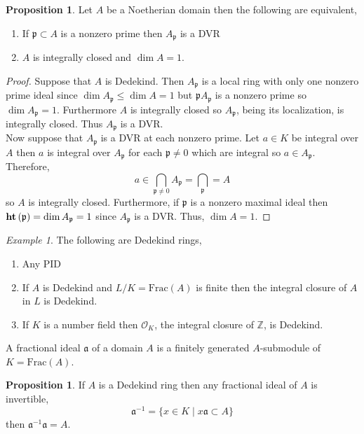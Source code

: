\documentclass[12pt]{article}
\newcommand{\Z}{\mathbb{Z}}
\newcommand{\Frac}[1]{\mathrm{Frac}\left(#1\right)}
\newcommand{\p}{\mathfrak{p}}
\renewcommand{\a}{\mathfrak{a}}
\theoremstyle{remark}
\newtheorem*{example}{Example}
\theoremstyle{definition}
\newtheorem{proposition}[theorem]{Proposition}
\newenvironment{definition}[1][Definition:]{\begin{trivlist}
\item[\hskip \labelsep {\bfseries #1}]}{\end{trivlist}}
\begin{document}
\begin{proposition}
Let $A$ be a Noetherian domain then the following are equivalent,
\begin{enumerate}
\item If $\p \subset A$ is a nonzero prime then $A_{\p}$ is a DVR
\item $A$ is integrally closed and $\dim{A} = 1$.
\end{enumerate}
\end{proposition}

\begin{proof}
Suppose that $A$ is Dedekind. Then $A_{\p}$ is a local ring with only one nonzero prime ideal since $\dim{A_{\p}} \le \dim{A} = 1$ but $\p A_{\p}$ is a nonzero prime so $\dim{A_{\p}} = 1$. Furthermore $A$ is integrally closed so $A_{\p}$, being its localization, is integrally closed. Thus $A_{\p}$ is a DVR. 
\bigskip\\
Now suppose that $A_{\p}$ is a DVR at each nonzero prime. Let $a \in K$ be integral over $A$ then $a$ is integral over $A_{\p}$ for each $\p \neq 0$ which are integral so $a \in A_{\p}$. Therefore,
\[ a \in \bigcap_{\p \neq 0} A_{\p} = \bigcap_{\p}  = A \]
so $A$ is integrally closed. Furthermore, if $\p$ is a nonzero maximal ideal then $\height{\p} = \dim{A_{\p}} = 1$ since $A_{\p}$ is a DVR. Thus, $\dim{A} = 1$. 
\end{proof}

\begin{example}
The following are Dedekind rings,
\begin{enumerate}
\item Any PID
\item If $A$ is Dedekind and $L / K = \Frac{A}$ is finite then the integral closure of $A$ in $L$ is Dedekind. 
\item If $K$ is a number field then $\mathcal{O}_K$, the integral closure of $\Z$, is Dedekind. 
\end{enumerate}
\end{example}

\begin{definition}
A fractional ideal $\a$ of a domain $A$ is a finitely generated $A$-submodule of $K = \Frac{A}$. 
\end{definition}

\begin{proposition}
If $A$ is a Dedekind ring then any fractional ideal of $A$ is invertible,
\[ \a^{-1} = \{ x \in K \mid x \a \subset A \} \]
then $\a^{-1} \a = A$. 
\end{proposition}
\end{document}
